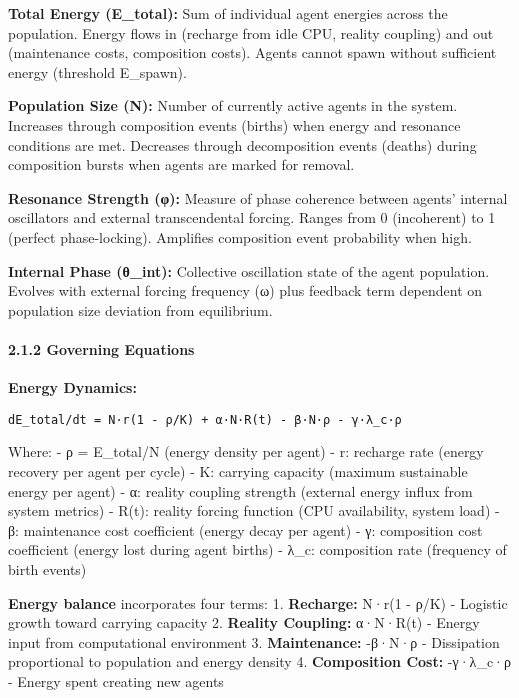 \documentclass[
]{article}
\begin{document}
\textbf{Total Energy (E\_total):} Sum of individual agent energies
across the population. Energy flows in (recharge from idle CPU, reality
coupling) and out (maintenance costs, composition costs). Agents cannot
spawn without sufficient energy (threshold E\_spawn).

\textbf{Population Size (N):} Number of currently active agents in the
system. Increases through composition events (births) when energy and
resonance conditions are met. Decreases through decomposition events
(deaths) during composition bursts when agents are marked for removal.

\textbf{Resonance Strength (φ):} Measure of phase coherence between
agents' internal oscillators and external transcendental forcing. Ranges
from 0 (incoherent) to 1 (perfect phase-locking). Amplifies composition
event probability when high.

\textbf{Internal Phase (θ\_int):} Collective oscillation state of the
agent population. Evolves with external forcing frequency (ω) plus
feedback term dependent on population size deviation from equilibrium.

\paragraph{2.1.2 Governing Equations}\label{governing-equations}

\textbf{Energy Dynamics:}

\begin{verbatim}
dE_total/dt = N·r(1 - ρ/K) + α·N·R(t) - β·N·ρ - γ·λ_c·ρ
\end{verbatim}

Where: - ρ = E\_total/N (energy density per agent) - r: recharge rate
(energy recovery per agent per cycle) - K: carrying capacity (maximum
sustainable energy per agent) - α: reality coupling strength (external
energy influx from system metrics) - R(t): reality forcing function (CPU
availability, system load) - β: maintenance cost coefficient (energy
decay per agent) - γ: composition cost coefficient (energy lost during
agent births) - λ\_c: composition rate (frequency of birth events)

\textbf{Energy balance} incorporates four terms: 1. \textbf{Recharge:}
N·r(1 - ρ/K) - Logistic growth toward carrying capacity 2.
\textbf{Reality Coupling:} α·N·R(t) - Energy input from computational
environment 3. \textbf{Maintenance:} -β·N·ρ - Dissipation proportional
to population and energy density 4. \textbf{Composition Cost:} -γ·λ\_c·ρ
- Energy spent creating new agents
\end{document}
